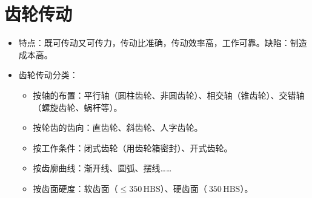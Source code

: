 \documentclass[12pt,a4paper]{article}
\newcommand{\tightlist}{\setlength{\parskip}{0pt}\setlength{\itemsep}{0pt}}
\newcommand{\hint}[1]{\textsf{（#1）}}
\begin{document}
\section{齿轮传动}
\begin{itemize}\tightlist
    \item 特点：既可传动又可传力，传动比准确，传动效率高，工作可靠。缺陷：制造成本高。
    \item 齿轮传动分类：
    \begin{itemize}\tightlist
        \item 按轴的布置：平行轴\hint{圆柱齿轮、非圆齿轮}、相交轴\hint{锥齿轮}、交错轴
        \hint{螺旋齿轮、蜗杆等}。
        \item 按轮齿的齿向：直齿轮、斜齿轮、人字齿轮。
        \item 按工作条件：闭式齿轮\hint{用齿轮箱密封}、开式齿轮。
        \item 按齿廓曲线：渐开线、圆弧、摆线……
        \item 按齿面硬度：软齿面\hint{$\leq350\,\text{HBS}$}、硬齿面\hint{$\>350
        \,\text{HBS}$}。
    \end{itemize}
\end{itemize}
\end{document}
